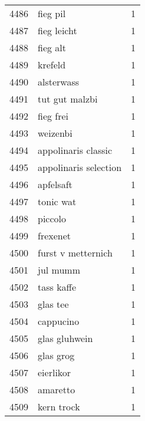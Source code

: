 \begin{tabular}{llr}
4486 &                                           fieg pil &      1 \\
4487 &                                        fieg leicht &      1 \\
4488 &                                           fieg alt &      1 \\
4489 &                                            krefeld &      1 \\
4490 &                                         alsterwass &      1 \\
4491 &                                     tut gut malzbi &      1 \\
4492 &                                          fieg frei &      1 \\
4493 &                                           weizenbi &      1 \\
4494 &                                appolinaris classic &      1 \\
4495 &                              appolinaris selection &      1 \\
4496 &                                          apfelsaft &      1 \\
4497 &                                          tonic wat &      1 \\
4498 &                                            piccolo &      1 \\
4499 &                                           frexenet &      1 \\
4500 &                                 furst v metternich &      1 \\
4501 &                                           jul mumm &      1 \\
4502 &                                         tass kaffe &      1 \\
4503 &                                           glas tee &      1 \\
4504 &                                          cappucino &      1 \\
4505 &                                      glas gluhwein &      1 \\
4506 &                                          glas grog &      1 \\
4507 &                                          eierlikor &      1 \\
4508 &                                           amaretto &      1 \\
4509 &                                         kern trock &      1 \\

\end{tabular}
